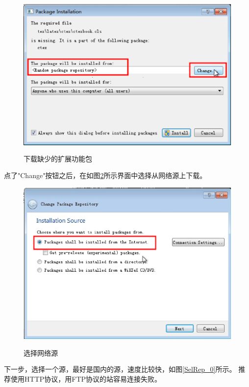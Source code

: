 \begin{figure}[th]
	\centering
	\includegraphics[scale=0.5]{./Pictures/SelRep.eps}\\
	\caption{下载缺少的扩展功能包}
	\label{SelRep}
\end{figure}

\newpage

点了"Change"按钮之后，在如图\ref{PkgInternet}所示界面中选择从网络源上下载。

\begin{figure}[th]
	\centering
	\includegraphics[scale=0.5]{./Pictures/PkgInternet.eps}\\
	\caption{选择网络源}
	\label{PkgInternet}
\end{figure}

下一步，选择一个源，最好是国内的源，速度比较快，如图\ref{SelRep_0}所示。
推荐使用HTTP协议，用FTP协议的站容易连接失败。

